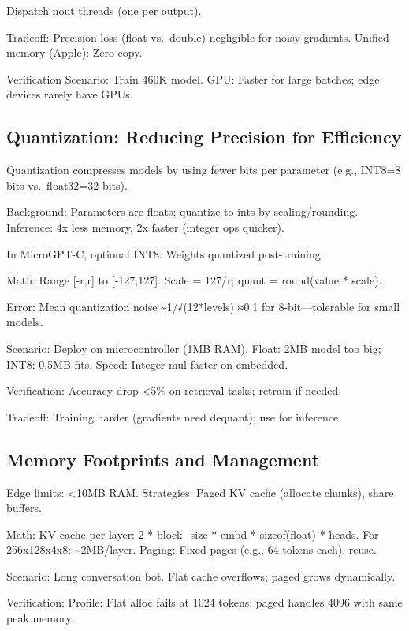 \documentclass[
]{article}
\begin{document}
Dispatch nout threads (one per output).

Tradeoff: Precision loss (float vs.~double) negligible for noisy
gradients. Unified memory (Apple): Zero-copy.

Verification Scenario: Train 460K model. GPU: Faster for large batches;
edge devices rarely have GPUs.

\subsection{Quantization: Reducing Precision for
Efficiency}\label{quantization-reducing-precision-for-efficiency}

Quantization compresses models by using fewer bits per parameter (e.g.,
INT8=8 bits vs.~float32=32 bits).

Background: Parameters are floats; quantize to ints by scaling/rounding.
Inference: 4x less memory, 2x faster (integer ops quicker).

In MicroGPT-C, optional INT8: Weights quantized post-training.

Math: Range {[}-r,r{]} to {[}-127,127{]}: Scale = 127/r; quant =
round(value * scale).

Error: Mean quantization noise \textasciitilde1/√(12*levels) ≈0.1 for
8-bit---tolerable for small models.

Scenario: Deploy on microcontroller (1MB RAM). Float: 2MB model too big;
INT8: 0.5MB fits. Speed: Integer mul faster on embedded.

Verification: Accuracy drop \textless5\% on retrieval tasks; retrain if
needed.

Tradeoff: Training harder (gradients need dequant); use for inference.

\subsection{Memory Footprints and
Management}\label{memory-footprints-and-management}

Edge limits: \textless10MB RAM. Strategies: Paged KV cache (allocate
chunks), share buffers.

Math: KV cache per layer: 2 * block\_size * embd * sizeof(float) *
heads. For 256x128x4x8: \textasciitilde2MB/layer. Paging: Fixed pages
(e.g., 64 tokens each), reuse.

Scenario: Long conversation bot. Flat cache overflows; paged grows
dynamically.

Verification: Profile: Flat alloc fails at 1024 tokens; paged handles
4096 with same peak memory.
\end{document}
